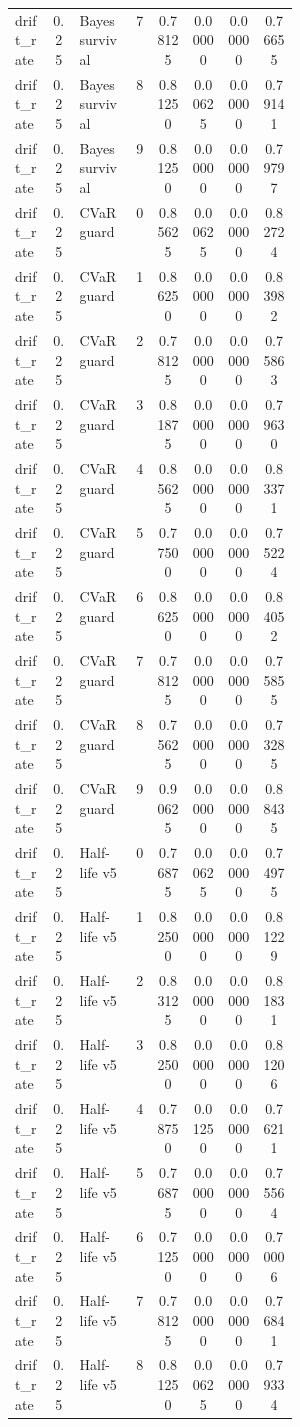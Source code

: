 \documentclass{article}
\begin{document}
\begin{center}
\begin{longtable}{p{0.13\linewidth}cp{0.20\linewidth}ccccc}
drift\_rate & 0.25 & Bayes survival & 7 & 0.78125 & 0.00000 & 0.00000 & 0.76655\\
drift\_rate & 0.25 & Bayes survival & 8 & 0.81250 & 0.00625 & 0.00000 & 0.79141\\
drift\_rate & 0.25 & Bayes survival & 9 & 0.81250 & 0.00000 & 0.00000 & 0.79797\\
drift\_rate & 0.25 & CVaR guard & 0 & 0.85625 & 0.00625 & 0.00000 & 0.82724\\
drift\_rate & 0.25 & CVaR guard & 1 & 0.86250 & 0.00000 & 0.00000 & 0.83982\\
drift\_rate & 0.25 & CVaR guard & 2 & 0.78125 & 0.00000 & 0.00000 & 0.75863\\
drift\_rate & 0.25 & CVaR guard & 3 & 0.81875 & 0.00000 & 0.00000 & 0.79630\\
drift\_rate & 0.25 & CVaR guard & 4 & 0.85625 & 0.00000 & 0.00000 & 0.83371\\
drift\_rate & 0.25 & CVaR guard & 5 & 0.77500 & 0.00000 & 0.00000 & 0.75224\\
drift\_rate & 0.25 & CVaR guard & 6 & 0.86250 & 0.00000 & 0.00000 & 0.84052\\
drift\_rate & 0.25 & CVaR guard & 7 & 0.78125 & 0.00000 & 0.00000 & 0.75855\\
drift\_rate & 0.25 & CVaR guard & 8 & 0.75625 & 0.00000 & 0.00000 & 0.73285\\
drift\_rate & 0.25 & CVaR guard & 9 & 0.90625 & 0.00000 & 0.00000 & 0.88435\\
drift\_rate & 0.25 & Half-life v5 & 0 & 0.76875 & 0.00625 & 0.00000 & 0.74975\\
drift\_rate & 0.25 & Half-life v5 & 1 & 0.82500 & 0.00000 & 0.00000 & 0.81229\\
drift\_rate & 0.25 & Half-life v5 & 2 & 0.83125 & 0.00000 & 0.00000 & 0.81831\\
drift\_rate & 0.25 & Half-life v5 & 3 & 0.82500 & 0.00000 & 0.00000 & 0.81206\\
drift\_rate & 0.25 & Half-life v5 & 4 & 0.78750 & 0.01250 & 0.00000 & 0.76211\\
drift\_rate & 0.25 & Half-life v5 & 5 & 0.76875 & 0.00000 & 0.00000 & 0.75564\\
drift\_rate & 0.25 & Half-life v5 & 6 & 0.71250 & 0.00000 & 0.00000 & 0.70006\\
drift\_rate & 0.25 & Half-life v5 & 7 & 0.78125 & 0.00000 & 0.00000 & 0.76841\\
drift\_rate & 0.25 & Half-life v5 & 8 & 0.81250 & 0.00625 & 0.00000 & 0.79334\\

\end{longtable}
\end{center}
\end{document}
